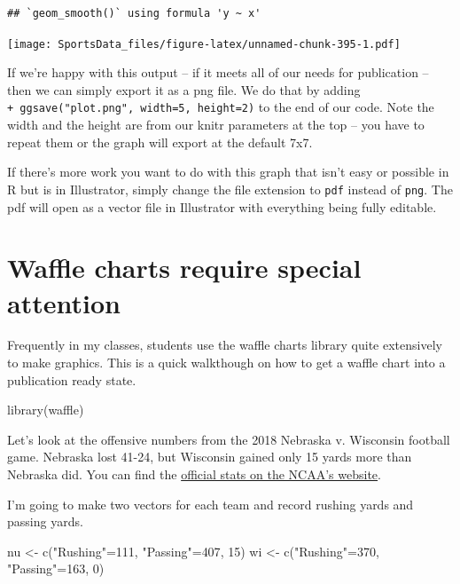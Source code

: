 \documentclass[
]{book}
\newenvironment{Shaded}{\begin{snugshade}}{\end{snugshade}}
\newcommand{\DecValTok}[1]{\textcolor[rgb]{0.00,0.00,0.81}{#1}}
\newcommand{\FunctionTok}[1]{\textcolor[rgb]{0.00,0.00,0.00}{#1}}
\newcommand{\NormalTok}[1]{#1}
\newcommand{\OtherTok}[1]{\textcolor[rgb]{0.56,0.35,0.01}{#1}}
\newcommand{\StringTok}[1]{\textcolor[rgb]{0.31,0.60,0.02}{#1}}
\begin{document}
\begin{verbatim}
## `geom_smooth()` using formula 'y ~ x'
\end{verbatim}

\texttt{[image: SportsData\_files/figure-latex/unnamed-chunk-395-1.pdf]}

If we're happy with this output -- if it meets all of our needs for publication -- then we can simply export it as a png file. We do that by adding \texttt{+\ ggsave("plot.png",\ width=5,\ height=2)} to the end of our code. Note the width and the height are from our knitr parameters at the top -- you have to repeat them or the graph will export at the default 7x7.

If there's more work you want to do with this graph that isn't easy or possible in R but is in Illustrator, simply change the file extension to \texttt{pdf} instead of \texttt{png}. The pdf will open as a vector file in Illustrator with everything being fully editable.

\hypertarget{waffle-charts-require-special-attention}{%
\section{Waffle charts require special attention}\label{waffle-charts-require-special-attention}}

Frequently in my classes, students use the waffle charts library quite extensively to make graphics. This is a quick walkthough on how to get a waffle chart into a publication ready state.

\begin{Shaded}
\begin{Highlighting}[]
\FunctionTok{library}\NormalTok{(waffle)}
\end{Highlighting}
\end{Shaded}

Let's look at the offensive numbers from the 2018 Nebraska v. Wisconsin football game. Nebraska lost 41-24, but Wisconsin gained only 15 yards more than Nebraska did. You can find the \href{https://www.ncaa.com/game/football/fbs/2018/10/06/nebraska-wisconsin/team-stats}{official stats on the NCAA's website}.

I'm going to make two vectors for each team and record rushing yards and passing yards.

\begin{Shaded}
\begin{Highlighting}[]
\NormalTok{nu }\OtherTok{\textless{}{-}} \FunctionTok{c}\NormalTok{(}\StringTok{"Rushing"}\OtherTok{=}\DecValTok{111}\NormalTok{, }\StringTok{"Passing"}\OtherTok{=}\DecValTok{407}\NormalTok{, }\DecValTok{15}\NormalTok{)}
\NormalTok{wi }\OtherTok{\textless{}{-}} \FunctionTok{c}\NormalTok{(}\StringTok{"Rushing"}\OtherTok{=}\DecValTok{370}\NormalTok{, }\StringTok{"Passing"}\OtherTok{=}\DecValTok{163}\NormalTok{, }\DecValTok{0}\NormalTok{)}
\end{Highlighting}
\end{Shaded}
\end{document}
